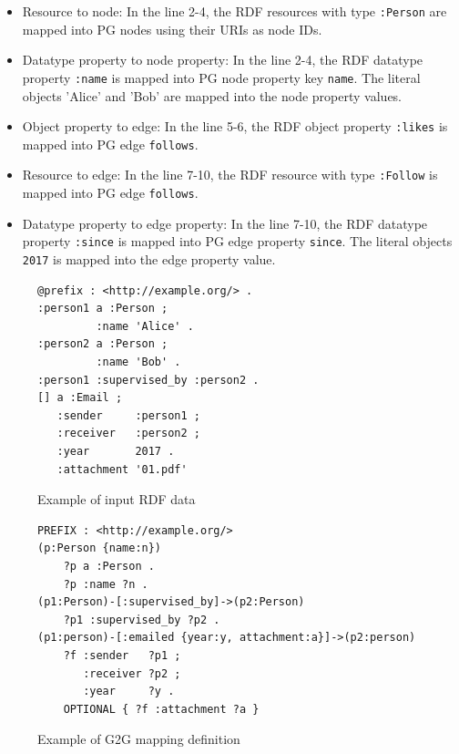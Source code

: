 \documentclass[runningheads]{llncs}
\begin{document}
\begin{itemize}
    \item Resource to node: In the line 2-4, the RDF resources with type \texttt{:Person} are mapped into PG nodes using their URIs as node IDs.
    \item Datatype property to node property: In the line 2-4, the RDF datatype property \texttt{:name} is mapped into PG node property key \texttt{name}. The literal objects 'Alice' and 'Bob' are mapped into the node property values.
    \item Object property to edge: In the line 5-6, the RDF object property \texttt{:likes} is mapped into PG edge \texttt{follows}. 
    \item Resource to edge: In the line 7-10, the RDF resource with type \texttt{:Follow} is mapped into PG edge \texttt{follows}. 
    \item Datatype property to edge property: In the line 7-10, the RDF datatype property \texttt{:since} is mapped into PG edge property \texttt{since}. The literal objects \texttt{2017} is mapped into the edge property value.
\end{itemize}


\begin{figure}[!t]
\begin{scriptsize}
\begin{verbatim}
@prefix : <http://example.org/> .
:person1 a :Person ;
         :name 'Alice' .
:person2 a :Person ;
         :name 'Bob' .
:person1 :supervised_by :person2 .
[] a :Email ;
   :sender     :person1 ;
   :receiver   :person2 ;
   :year       2017 .
   :attachment '01.pdf'
\end{verbatim}
\end{scriptsize}
\caption{Example of input RDF data}
\label{fig:example-rdf}
\end{figure}


\begin{figure}[!t]
\begin{scriptsize}
\begin{verbatim}
PREFIX : <http://example.org/>
(p:Person {name:n})
    ?p a :Person .
    ?p :name ?n .
(p1:Person)-[:supervised_by]->(p2:Person)
    ?p1 :supervised_by ?p2 .
(p1:person)-[:emailed {year:y, attachment:a}]->(p2:person)
    ?f :sender   ?p1 ;
       :receiver ?p2 ;
       :year     ?y .
    OPTIONAL { ?f :attachment ?a }
\end{verbatim}
\end{scriptsize}
\caption{Example of G2G mapping definition}
\label{fig:example-g2g}
\end{figure}
\end{document}
